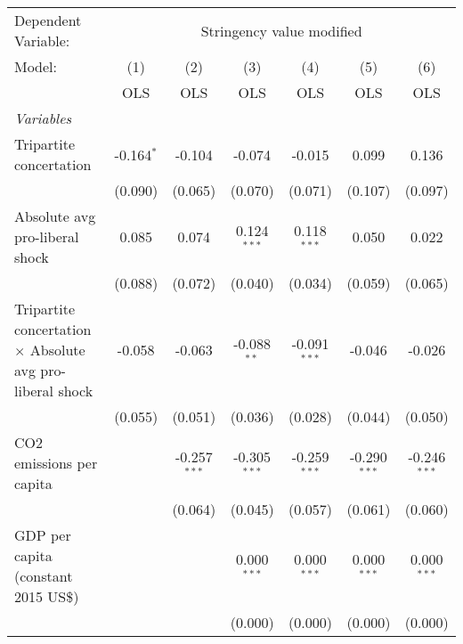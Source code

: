 
\begingroup
\centering
\begin{tabular}{lcccccc}
   \toprule
   Dependent Variable: & \multicolumn{6}{c}{Stringency value modified}\\
   Model:                                                           & (1)          & (2)            & (3)            & (4)            & (5)            & (6)\\  
                                                                    &  OLS         & OLS            & OLS            & OLS            & OLS            & OLS\\  
   \midrule
   \emph{Variables}\\
   Tripartite concertation                                          & -0.164$^{*}$ & -0.104         & -0.074         & -0.015         & 0.099          & 0.136\\   
                                                                    & (0.090)      & (0.065)        & (0.070)        & (0.071)        & (0.107)        & (0.097)\\   
   Absolute avg pro-liberal shock                                   & 0.085        & 0.074          & 0.124$^{***}$  & 0.118$^{***}$  & 0.050          & 0.022\\   
                                                                    & (0.088)      & (0.072)        & (0.040)        & (0.034)        & (0.059)        & (0.065)\\   
   Tripartite concertation $\times$ Absolute avg pro-liberal shock  & -0.058       & -0.063         & -0.088$^{**}$  & -0.091$^{***}$ & -0.046         & -0.026\\   
                                                                    & (0.055)      & (0.051)        & (0.036)        & (0.028)        & (0.044)        & (0.050)\\   
   CO2 emissions per capita                                         &              & -0.257$^{***}$ & -0.305$^{***}$ & -0.259$^{***}$ & -0.290$^{***}$ & -0.246$^{***}$\\   
                                                                    &              & (0.064)        & (0.045)        & (0.057)        & (0.061)        & (0.060)\\   
   GDP per capita (constant 2015 US\$)                              &              &                & 0.000$^{***}$  & 0.000$^{***}$  & 0.000$^{***}$  & 0.000$^{***}$\\   
                                                                    &              &                & (0.000)        & (0.000)        & (0.000)        & (0.000)\\   

\end{tabular}
